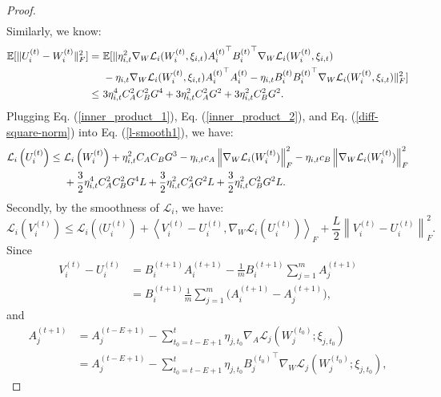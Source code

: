 \begin{proof}
\begin{align}
\end{align}
Similarly, we know:
\begin{align}\label{diff-square-norm}
\mathbb{E}[\|U_i^{(t)}-W_i^{(t)}\|_F^2] \notag
= \ & \mathbb{E}[\|\eta_{i,t}^2 \nabla_{W}\mathcal{L}_i(W_i^{(t)},\xi_{i,t}){A_i^{(t)}}^{\top}{B_i^{(t)}}^{\top}\nabla_{W}\mathcal{L}_i(W_i^{(t)},\xi_{i,t}) \notag \\
& - \eta_{i,t}\nabla_{W}\mathcal{L}_i(W_i^{(t)},\xi_{i,t}){A_i^{(t)}}^{\top}A_i^{(t)} - \eta_{i,t}B_i^{(t)}{B_i^{(t)}}^{\top}\nabla_{W}\mathcal{L}_i(W_i^{(t)},\xi_{i,t})\|_F^2] \notag \\
\leq \ & 3\eta_{i,t}^4 C_A^2 C_B^2G^4+3\eta_{i,t}^2 C_A^2 G^2 + 3\eta_{i,t}^2 C_B^2 G^2.
\end{align}
Plugging Eq. (\ref{inner_product_1}), Eq. (\ref{inner_product_2}), and Eq. (\ref{diff-square-norm}) into Eq. (\ref{l-smooth1}), we have:
\begin{align}\label{main-ineq-1}
\mathcal{L}_i\left(U_i^{(t)}\right) \notag
\leq \ &\mathcal{L}_i\left(W_i^{(t)}\right)+\eta_{i,t}^2 C_A C_B G^3 - \eta_{i,t} c_A \left\|\nabla_{W}\mathcal{L}_i(W_i^{(t)})\right\|_F^2 - \eta_{i,t} c_B \left\|\nabla_{W}\mathcal{L}_i(W_i^{(t)})\right\|_F^2 \notag\\
&+\frac{3}{2}\eta_{i,t}^4 C_A^2 C_B^2G^4L+\frac{3}{2}\eta_{i,t}^2 C_A^2 G^2L + \frac{3}{2}\eta_{i,t}^2 C_B^2 G^2L.
\end{align}
Secondly, by the smoothness of $\mathcal{L}_i$, we have:
\begin{equation}\label{l-smooth2}
\mathcal{L}_i\left(V_i^{(t)}\right) \leq \mathcal{L}_i\left((U_i^{(t)}\right)+\left\langle V_i^{(t)}-U_i^{(t)}, \nabla_{W}\mathcal{L}_i(U_i^{(t)})\right\rangle_F+\frac{L}{2}\left\|V_i^{(t)}-U_i^{(t)}\right\|^2_F.
\end{equation}
Since
\begin{equation*}
\begin{aligned}
V_i^{(t)} - U_i^{(t)}
& = B_i^{(t+1)}A_i^{(t+1)} - \frac{1}{m}B_i^{(t+1)}\sum_{j=1}^m A_j^{(t+1)}\\
& = B_i^{(t+1)}\frac{1}{m}\sum_{j=1}^m\Big(A_i^{(t+1)} - A_j^{(t+1)}\Big),
\end{aligned}
\end{equation*}
and 
\begin{align*}
A_j^{(t+1)} 
& = A_j^{(t-E+1)} - \sum_{t_0=t-E+1}^t \eta_{j,t_0} \nabla_A \mathcal{L}_j(W_j^{(t_0)};\xi_{j,t_0})\\
& = A_j^{(t-E+1)} - \sum_{t_0=t-E+1}^t \eta_{j,t_0}{B_j^{(t_0)}}^{\top} \nabla_W \mathcal{L}_j(W_j^{(t_0)};\xi_{j,t_0}),

\end{align*}
\end{proof}
